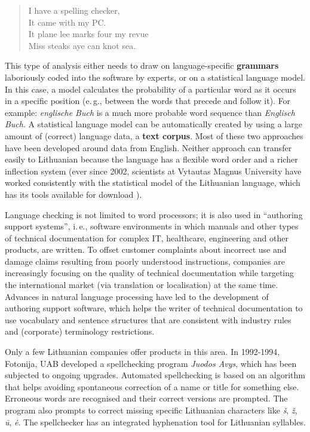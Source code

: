 \begin{multicols}{2}
\begin{quote}
  I have a spelling checker,\\
  It came with my PC.\\
  It plane lee marks four my revue\\
  Miss steaks aye can knot sea.
\end{quote}


This type of analysis either needs to draw on language-specific \textbf{grammars} laboriously coded into the software by experts, or on a statistical language model. In this case, a model calculates the probability of a particular word as it occurs in a specific position (e.\,g., between the words that precede and follow it). For example: \textit{englische Buch} is a much more probable word sequence than \textit{Englisch Buch}. A statistical language model can be automatically created by using a large amount of (correct) language data, a \textbf{text corpus}. Most of these two approaches have been developed around data from English. Neither approach can transfer easily to Lithuanian because the language has a flexible word order and a richer inflection system (ever since 2002, scientists at Vytautas Magnus University have worked consistently with the statistical model of the Lithuanian language, which has its tools available for download \cite{airenas}).


Language checking is not limited to word processors; it is also used in “authoring support systems”, i.\,e., software environments in which manuals and other types of technical documentation for complex IT, healthcare, engineering and other products, are written. To offset customer complaints about incorrect use and damage claims resulting from poorly understood instructions, companies are increasingly focusing on the quality of technical documentation while targeting the international market (via translation or localisation) at the same time. Advances in natural language processing have led to the development of authoring support software, which helps the writer of technical documentation to use vocabulary and sentence structures that are consistent with industry rules and (corporate) terminology restrictions.


Only a few Lithuanian companies offer products in this area. In 1992-1994, Fotonija, UAB developed a spellchecking program \textit{Juodos Avys}, which has been subjected to ongoing upgrades. Automated spellchecking is based on an algorithm that helps avoiding spontaneous correction of a name or title for something else. Erroneous words are recognised and their correct versions are prompted. The program also prompts to correct missing specific Lithuanian characters like \textit{š}, \textit{ž},  \textit{ū}, \textit{ė}. The spellchecker has an integrated hyphenation tool for Lithuanian syllables.


\end{multicols}
